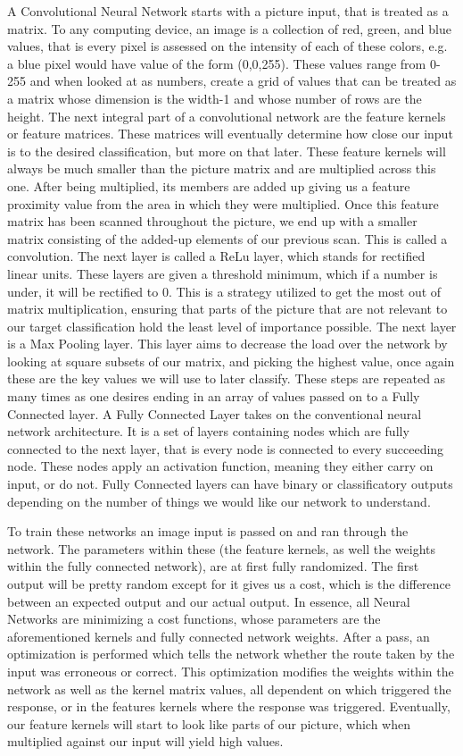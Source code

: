 \documentclass[article, onecolumn, draftclsnofoot,10pt, compsoc]{IEEEtran}
\begin{document}
A Convolutional Neural Network starts with a picture input, that is treated as a matrix. To any computing device, an image is a collection of red, green, and blue values, that is every pixel is assessed on the intensity of each of these colors, e.g. a blue pixel would have value of the form (0,0,255). These values range from 0-255 and when looked at as numbers, create a grid of values that can be treated as a matrix whose dimension is the width-1 and whose number of rows are the height. The next integral part of a convolutional network are the feature kernels or feature matrices. These matrices will eventually determine how close our input is to the desired classification, but more on that later. These feature kernels will always be much smaller than the picture matrix and are multiplied across this one. After being multiplied, its members are added up giving us a feature proximity value from the area in which they were multiplied. Once this feature matrix has been scanned throughout the picture, we end up with a smaller matrix consisting of the added-up elements of our previous scan. This is called a convolution.  The next layer is called a ReLu layer, which stands for rectified linear units. These layers are given a threshold minimum, which if a number is under, it will be rectified to 0. This is a strategy utilized to get the most out of matrix multiplication, ensuring that parts of the picture that are not relevant to our target classification hold the least level of importance possible. The next layer is a Max Pooling layer. This layer aims to decrease the load over the network by looking at square subsets of our matrix, and picking the highest value, once again these are the key values we will use to later classify. These steps are repeated as many times as one desires ending in an array of values passed on to a Fully Connected layer. A Fully Connected Layer takes on the conventional neural network architecture. It is a set of layers containing nodes which are fully connected to the next layer, that is every node is connected to every succeeding node. These nodes apply an activation function, meaning they either carry on input, or do not. Fully Connected layers can have binary or classificatory outputs depending on the number of things we would like our network to understand. 

To train these networks an image input is passed on and ran through the network. The parameters within these (the feature kernels, as well the weights within the fully connected network), are at first fully randomized. The first output will be pretty random except for it gives us a cost, which is the difference between an expected output and our actual output. In essence, all Neural Networks are minimizing a cost functions, whose parameters are the aforementioned kernels and fully connected network weights. After a pass, an optimization is performed which tells the network whether the route taken by the input was erroneous or correct. This optimization modifies the weights within the network as well as the kernel matrix values, all dependent on which triggered the response, or in the features kernels where the response was triggered. Eventually, our feature kernels will start to look like parts of our picture, which when multiplied against our input will yield high values. 
\end{document}
